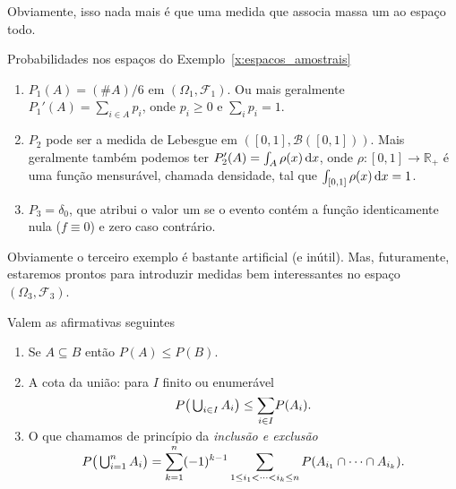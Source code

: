 Obviamente, isso nada mais é que uma medida que associa massa um ao espaço todo.

\begin{example} Probabilidades nos espaços do Exemplo~\ref{x:espacos_amostrais}
  \begin{enumerate}[\quad a)]
  \item $P_1(A) = (\#A)/6$ em $(\Omega_1, \mathcal{F}_1)$.
    Ou mais geralmente $P_1'(A) = \sum_{i \in A} p_i$, onde $p_i \geq 0$ e $\sum_i p_i = 1$.
  \item $P_2$ pode ser a medida de Lebesgue em $([0,1], \mathcal{B}([0,1]))$.
    Mais geralmente também podemos ter $P_2'(A) = \int_A \rho(x) \mathop{}\!\mathrm{d} x$, onde $\rho:[0,1] \to \mathbb{R}_+$ é uma função mensurável, chamada densidade, tal que $\int_{[0,1]} \rho (x) \mathop{}\!\mathrm{d} x = 1$.
  \item $P_3 = \delta_{0}$, que atribui o valor um se o evento contém a função identicamente nula ($f \equiv 0$) e zero caso contrário.
  \end{enumerate}
\end{example}
Obviamente o terceiro exemplo é bastante artificial (e inútil).
Mas, futuramente, estaremos prontos para introduzir medidas bem interessantes no espaço $(\Omega_3, \mathcal{F}_3)$.

\begin{proposition}
  Valem as afirmativas seguintes
  \begin{enumerate}[\quad a)]
  \item Se $A \subseteq B$ então $P(A) \leq P(B)$.
  \item A cota da união: para $I$ finito ou enumerável
    \begin{equation}
      P\big(\operatorname*{{\textstyle \bigcup}}\nolimits_{i\in I} A_i\big) \leq \smash{\sum\limits_{i\in I}} P(A_i).
    \end{equation}
  \item O que chamamos de princípio da \emph{inclusão e exclusão} 
    \begin{equation}
      P\big(\operatorname*{{\textstyle \bigcup}}\nolimits_{i=1}^{n} A_i\big) = \smash{\sum\limits_{k = 1}^n} (-1)^{k-1} \sum\limits_{1 \leq i_1 < \dots < i_k \leq n} P(A_{i_1} \cap \dots \cap A_{i_k}).
    \end{equation}
  \end{enumerate}
\end{proposition}

